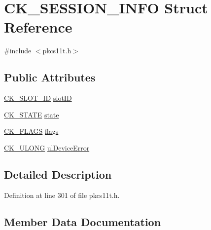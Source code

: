 \hypertarget{struct_c_k___s_e_s_s_i_o_n___i_n_f_o}{}\section{C\+K\+\_\+\+S\+E\+S\+S\+I\+O\+N\+\_\+\+I\+N\+FO Struct Reference}
\label{struct_c_k___s_e_s_s_i_o_n___i_n_f_o}


{\ttfamily \#include $<$pkcs11t.\+h$>$}

\subsection*{Public Attributes}
\begin{DoxyCompactItemize}
\item 
\hyperlink{pkcs11t_8h_a53398953158f3b452e0513a0b78a0c5a}{C\+K\+\_\+\+S\+L\+O\+T\+\_\+\+ID} \hyperlink{struct_c_k___s_e_s_s_i_o_n___i_n_f_o_a7d23320809045e8e249f7eaee3be95dc}{slot\+ID}
\item 
\hyperlink{pkcs11t_8h_aed206032672e4a4edcce33a364ff0445}{C\+K\+\_\+\+S\+T\+A\+TE} \hyperlink{struct_c_k___s_e_s_s_i_o_n___i_n_f_o_af81b1726577cff3cb2ea3300d788e9f4}{state}
\item 
\hyperlink{pkcs11t_8h_a53850492c1ba57aca4332be791a3c6a3}{C\+K\+\_\+\+F\+L\+A\+GS} \hyperlink{struct_c_k___s_e_s_s_i_o_n___i_n_f_o_a58c14db50c63ab280fa00711755b10d9}{flags}
\item 
\hyperlink{pkcs11t_8h_a35181858a3b7a0a81f49d180d8f446ef}{C\+K\+\_\+\+U\+L\+O\+NG} \hyperlink{struct_c_k___s_e_s_s_i_o_n___i_n_f_o_aced90615c518173a0e3fffc37c5e119f}{ul\+Device\+Error}
\end{DoxyCompactItemize}


\subsection{Detailed Description}


Definition at line 301 of file pkcs11t.\+h.



\subsection{Member Data Documentation}
\mbox{\label{struct_c_k___s_e_s_s_i_o_n___i_n_f_o_a58c14db50c63ab280fa00711755b10d9}} 
